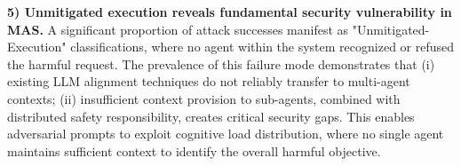 \textbf{5) Unmitigated execution reveals fundamental security vulnerability in MAS.} A significant proportion of attack successes manifest as "Unmitigated-Execution" classifications, where no agent within the system recognized or refused the harmful request. The prevalence of this failure mode demonstrates that (i) existing LLM alignment techniques do not reliably transfer to multi-agent contexts; (ii) insufficient context provision to sub-agents, combined with distributed safety responsibility, creates critical security gaps. This enables adversarial prompts to exploit cognitive load distribution, where no single agent maintains sufficient context to identify the overall harmful objective.